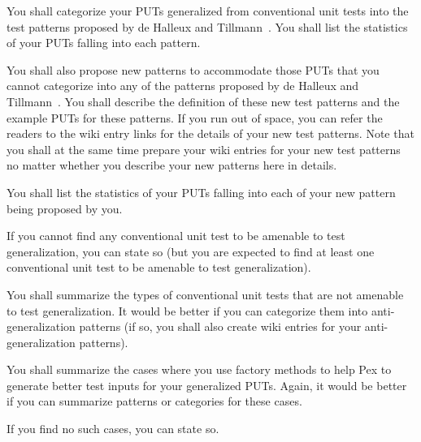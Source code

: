 \documentclass[times, 10pt,twocolumn]{article}
\begin{document}
\label{sec:amenable}

You shall categorize your PUTs generalized from conventional unit
tests into the test patterns proposed by de Halleux and
Tillmann~\cite{halleux08:putpatterns}. You shall list the statistics
of your PUTs falling into each pattern.

You shall also propose new patterns to accommodate those PUTs that
you cannot categorize into any of the patterns proposed by de
Halleux and Tillmann~\cite{halleux08:putpatterns}. You shall
describe the definition of these new test patterns and the example
PUTs for these patterns. If you run out of space, you can refer the
readers to the wiki entry links for the details of your new test
patterns. Note that you shall at the same time prepare your wiki
entries for your new test patterns no matter whether you describe
your new patterns here in details.

You shall list the statistics of your PUTs falling into each of your
new pattern being proposed by you.

If you cannot find any conventional unit test to be amenable to test
generalization, you can state so (but you are expected to find at
least one conventional unit test to be amenable to test
generalization).


 \label{sec:notamenable}

You shall summarize the types of conventional unit tests that are
not amenable to test generalization. It would be better if you can
categorize them into anti-generalization patterns (if so, you shall
also create wiki entries for your anti-generalization patterns).



 \label{sec:factory}

You shall summarize the cases where you use factory methods to help
Pex to generate better test inputs for your generalized PUTs. Again,
it would be better if you can summarize patterns or categories for
these cases.

If you find no such cases, you can state so.

 \label{sec:mock}
\end{document}
